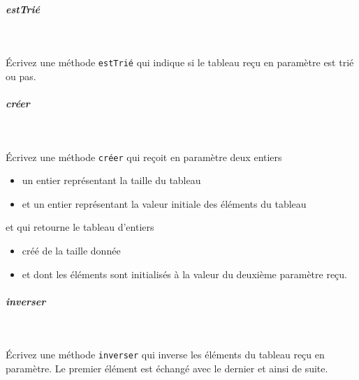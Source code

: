 \documentclass[11pt,a4paper]{article}
\begin{document}
			
		\subparagraph{estTri\'e} 
		
					\textcolor{white}{.} \par
				
            \par
        
					\'Ecrivez une m\'ethode 
					\verb|estTrié|
					qui indique si le tableau re\c cu
					en param\`etre est tri\'e ou pas.
				
            \par
        
			
		\subparagraph{cr\'eer} 
		
					\textcolor{white}{.} \par
				
            \par
        
					\'Ecrivez une m\'ethode 
					\verb|créer| 
					qui re\c coit en param\`etre deux entiers
					
					\begin{itemize}
				
			\item un entier repr\'esentant la taille du tableau
			\item et un entier repr\'esentant la valeur initiale des \'el\'ements du tableau
					\end{itemize}
				
					et qui retourne le tableau d'entiers
					
					\begin{itemize}
				
			\item cr\'e\'e de la taille donn\'ee
			\item et dont les \'el\'ements sont initialis\'es \`a la valeur du deuxi\`eme param\`etre re\c cu.
					\end{itemize}
				
            \par
        
			
		\subparagraph{inverser} 
		
					\textcolor{white}{.} \par
				
            \par
        
					\'Ecrivez une m\'ethode 
					\verb|inverser| 
					qui inverse les \'el\'ements du tableau re\c cu en param\`etre.
					Le premier \'el\'ement est \'echang\'e avec le dernier 
					et ainsi de suite.
				
\end{document}
